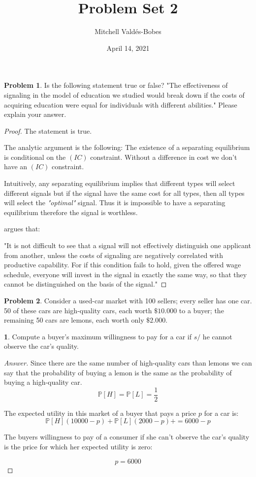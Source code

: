 \documentclass[12pt]{article}
\title{Problem Set 2}
\author{Mitchell Valdés-Bobes}
\date{April 14, 2021}
\theoremstyle{definition}
\newtheorem{problem}{Problem}
\newtheorem{subproblem}{}[problem]
\begin{document}
\maketitle

\begin{problem}
Is the following statement true or false? "The effectiveness of signaling in the model of education we studied would break down if the costs of acquiring education were equal for individuals with different abilities." Please explain your answer.
\end{problem}
\begin{proof}
The statement is true.

The analytic argument is the following: The existence of a separating equilibrium is conditional on the $(IC)$ constraint. Without a difference in cost we don't have an $(IC)$ constraint.

Intuitively, any separating equilibrium implies that different types will select different signals but if the signal have the same cost for all types, then all types will select the \textit{"optimal"} signal. Thus it is impossible to have a separating equilibrium therefore the signal is worthless.

\cite[p.~358]{spence_job_1973} argues that:

"It is not difficult to see that a signal will not effectively distinguish one applicant from another, unless the costs of signaling are negatively correlated with productive capability. For if this condition fails to hold, given the offered wage schedule, everyone will invest in the signal in exactly the same way, so that they cannot be
distinguished on the basis of the signal."
\end{proof}


\begin{problem}
Consider a used-car market with 100 sellers; every seller has one car. 50 of these cars are high-quality cars, each worth $\$ 10.000$ to a buyer; the remaining 50 cars are lemons, each worth only $\$ 2.000$.
\end{problem}
\begin{subproblem}
Compute a buyer's maximum willingness to pay for a car if $s /$ he cannot observe the car's quality.
\end{subproblem}
\begin{proof}[Answer]
Since there are the same number of high-quality cars than lemons we can say that the probability of buying a lemon is the same as the probability of buying a high-quality car. 
$$\mathbb{P}[H] = \mathbb{P}[L] =\frac{1}{2}$$


The expected utility in this market of a buyer that pays a price $p$ for a car is:
$$\mathbb{P}[H](10000 - p) +  \mathbb{P}[L](2000 - p) +  = 6000-p$$

The buyers willingness to pay of a consumer if she can't observe the car's quality is the price for which her expected utility is zero:

$$\boxed{p = 6000}$$

\end{proof}
\end{document}
